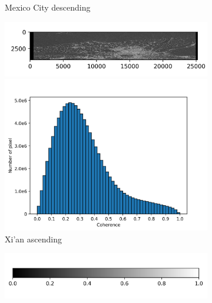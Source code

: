 \documentclass[a4paper,fleqn]{cas-sc}
\begin{document}
\begin{figure}
\begin{subfigure}{0.5\textwidth}
\begin{minipage}{0.5\textwidth}
        \end{minipage}
        \caption{Mexico City descending}
        \label{fig_6d}
    \end{subfigure}%
    \hfill
    \begin{subfigure}{0.5\textwidth}
        \centering
        \begin{minipage}{0.5\textwidth}
            \centering
            \includegraphics[width=\textwidth]{figure/The coherence/coh_XiAn_asc_esd1.png}
        \end{minipage}%
        \begin{minipage}{0.5\textwidth}
            \centering
            \includegraphics[width=\textwidth]{figure/The coherence/coh_XiAn_asc_esd1_histogram_.png}
        \end{minipage}
        \caption{Xi'an ascending}
        \label{fig_6e}
    \end{subfigure}%
    \begin{subfigure}{0.5\textwidth}
        \centering
        \includegraphics[width=\textwidth]{figure/The coherence/colorbar.png}

\end{subfigure}
\end{figure}
\end{document}
